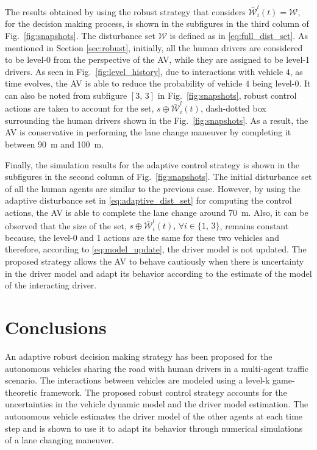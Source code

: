 \documentclass[10pt,journal]{IEEEtran}
\begin{document}
	The results obtained by using the robust strategy that considers $\bar{\mathcal{W}}_{i}^{l}(t) = \mathcal{W}$, for the decision making process, is shown in the subfigures in the third column of Fig.~\ref{fig:snapshots}. The disturbance set $\mathcal{W}$ is defined as in \eqref{eq:full_dist_set}. As mentioned in Section \ref{sec:robust}, initially, all the human drivers are considered to be level-0 from the perspective of the AV, while they are assigned to be level-1 drivers. As seen in Fig.~\ref{fig:level_history}, due to interactions with vehicle $4$, as time evolves, the AV is able to reduce the probability of vehicle $4$ being level-0. It can also be noted from subfigure $[3,\,3]$ in Fig.~\ref{fig:snapshots}, robust control actions are taken to account for the set, $s \oplus \bar{\mathcal{W}}_{i}^{l}(t)$, dash-dotted box surrounding the human drivers shown in the Fig.~\ref{fig:snapshots}. As a result, the AV is conservative in performing the lane change maneuver by completing it between \SI{90}{m} and \SI{100}{m}. 
	
	Finally, the simulation results for the adaptive control strategy is shown in the subfigures in the second column of Fig.~\ref{fig:snapshots}. The initial disturbance set of all the human agents are similar to the previous case. However, by using the adaptive disturbance set in \eqref{eq:adaptive_dist_set} for computing the control actions, the AV is able to complete the lane change around \SI{70}{m}. Also, it can be observed that the size of the set, $s \oplus \bar{\mathcal{W}}_{i}^{l}(t), \, \forall i \in \{1,\,3\}$, remains constant because, the level-0 and 1 actions are the same for these two vehicles and therefore, according to \eqref{eq:model_update}, the driver model is not updated. The proposed strategy allows the AV to behave cautiously when there is uncertainty in the driver model and adapt its behavior according to the estimate of the model of the interacting driver.

	
	
	
	\section{Conclusions}
	\label{sec:conclusions}

	An adaptive robust decision making strategy has been proposed for the autonomous vehicles sharing the road with human drivers in a multi-agent traffic scenario. The interactions between vehicles are modeled using a level-k game-theoretic framework. The proposed robust control strategy accounts for the uncertainties in the vehicle dynamic model and the driver model estimation. The autonomous vehicle estimates the driver model of the other agents at each time step and is shown to use it to adapt its behavior through numerical simulations of a lane changing maneuver. 
	
\end{document}
